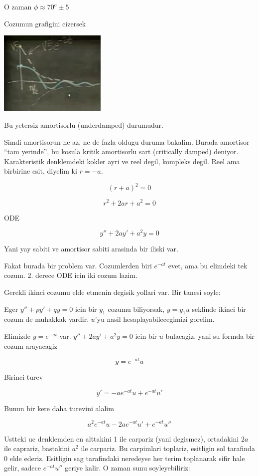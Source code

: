 \documentclass[12pt,fleqn]{article}
\begin{document}
O zaman $\phi \approx 70^{o} \pm 5$

Cozumun grafigini cizersek

\includegraphics[height=4cm]{9_4.png}

Bu yetersiz amortisorlu (underdamped) durumudur. 

Simdi amortisorun ne az, ne de fazla oldugu duruma bakalim. Burada
amortisor ``tam yerinde'', bu kosula kritik amortisorlu sart (critically
damped) deniyor. Karakteristik denklemdeki kokler ayri ve reel degil,
kompleks degil. Reel ama birbirine esit, diyelim ki $r = -a$. 

\[ (r+a)^2 = 0 \]

\[ r^2 + 2ar + a^2 = 0 \]

ODE

\[ y'' + 2ay' + a^2y = 0 \]

Yani yay sabiti ve amortisor sabiti arasinda bir iliski var. 

Fakat burada bir problem var. Cozumlerden biri $e^{-at}$ evet, ama bu
elimdeki tek cozum. 2. derece ODE icin iki cozum lazim. 

Gerekli ikinci cozumu elde etmenin degisik yollari var. Bir tanesi soyle:

Eger $y'' + py' + qy = 0$ icin bir $y_1$ cozumu biliyorsak, $y = y_1 u$
seklinde ikinci bir cozum de muhakkak vardir. $u$'yu nasil
hesaplayabilecegimizi gorelim.

Elimizde $y = e^{-at}$ var. $y'' + 2ay' + a^2y = 0$ icin bir $u$ bulacagiz,
yani su formda bir cozum arayacagiz

\[ y = e^{-at} u \]

Birinci turev

\[ y' = -a e^{-at}u + e^{-at} u' \]

Bunun bir kere daha turevini alalim

\[ a^2e^{-at}u - 2ae^{-at}u' + e^{-at}u'' \]

Ustteki uc denklemden en alttakini 1 ile carpariz (yani degismez),
ortadakini $2a$ ile caprariz, bastakini $a^2$ ile carpariz. Bu carpimlari
toplariz, esitligin sol tarafinda 0 elde ederiz. Esitligin sag tarafindaki
neredeyse her terim toplanarak sifir hale gelir, sadece $e^{-at}u''$ geriye
kalir. O zaman sunu soyleyebiliriz:
\end{document}
